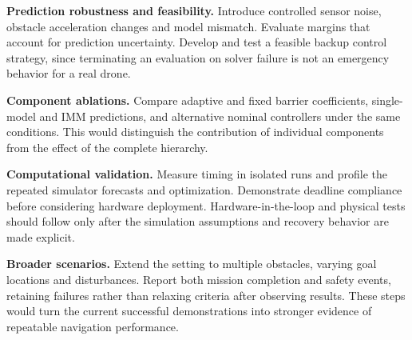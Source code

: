 \textbf{Prediction robustness and feasibility.} Introduce controlled sensor noise, obstacle acceleration changes and model mismatch. Evaluate margins that account for prediction uncertainty. Develop and test a feasible backup control strategy, since terminating an evaluation on solver failure is not an emergency behavior for a real drone.

\textbf{Component ablations.} Compare adaptive and fixed barrier coefficients, single-model and IMM predictions, and alternative nominal controllers under the same conditions. This would distinguish the contribution of individual components from the effect of the complete hierarchy.

\textbf{Computational validation.} Measure timing in isolated runs and profile the repeated simulator forecasts and optimization. Demonstrate deadline compliance before considering hardware deployment. Hardware-in-the-loop and physical tests should follow only after the simulation assumptions and recovery behavior are made explicit.

\textbf{Broader scenarios.} Extend the setting to multiple obstacles, varying goal locations and disturbances. Report both mission completion and safety events, retaining failures rather than relaxing criteria after observing results. These steps would turn the current successful demonstrations into stronger evidence of repeatable navigation performance.
